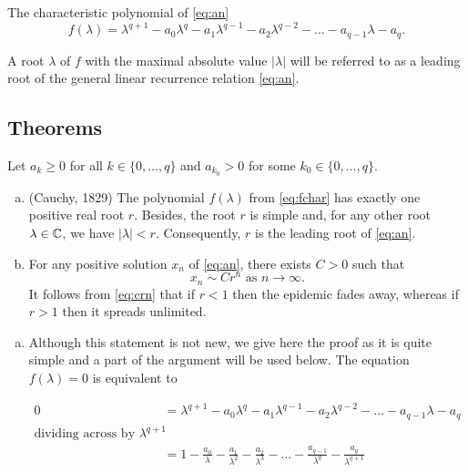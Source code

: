 The characteristic polynomial of \ref{eq:an}
\begin{equation}\label{eq:fchar}
    f(\lambda) = \lambda^{q+1} - a_0\lambda^q - a_1\lambda^{q-1} - a_2\lambda^{q-2} - \dots - a_{q-1}\lambda - a_q.
\end{equation}

\begin{definition}
A root $\lambda$ of $f$ with the maximal absolute value $|\lambda|$ will be referred to as a leading root of the general linear recurrence relation \ref{eq:an}.
\end{definition}

\subsection{Theorems}
\begin{theorem}
Let $a_k \geq 0$ for all $k \in \{0,\dots,q\}$ and $a_{k_0} > 0$ for some $k_0\in \{0,\dots,q\}$.
\begin{enumerate}[(a)]
    \item (Cauchy, 1829) The polynomial $f(\lambda)$ from \ref{eq:fchar} has exactly one positive real root $r$. Besides, the root $r$ is simple and, for any other root $\lambda \in \mathbb C$, we have $|\lambda| < r$. Consequently, $r$ is the leading root of \ref{eq:an}.
    \item For any positive solution $x_n$ of \ref{eq:an}, there exists $C > 0$ such that
    \begin{equation}\label{eq:crn}
        x_n \sim Cr^n \text{ as } n\to\infty.
    \end{equation}
    It follows from \ref{eq:crn} that if $r < 1$ then the epidemic fades away, whereas if $r > 1$ then it spreads unlimited.
\end{enumerate}
\begin{pf}
\begin{enumerate}[(a)]
\item Although this statement is not new, we give here the proof as it is quite simple and a part of the argument will be used below. The equation $f(\lambda) = 0$ is equivalent to

$\begin{aligned}
0 &= \lambda^{q+1} - a_0\lambda^q - a_1\lambda^{q-1} - a_2\lambda^{q-2} - \dots - a_{q-1}\lambda - a_q \\
\text{dividing across by } \lambda^{q+1} \\
  &= 1 - \frac{a_0}{\lambda} - \frac{a_1}{\lambda^2} - \frac{a_2}{\lambda^3}-\dots - \frac{a_{q-1}}{\lambda^q} -\frac{a_q}{\lambda^{q+1}}
\end{aligned}$
    

\end{enumerate}
\end{pf}
\end{theorem}
